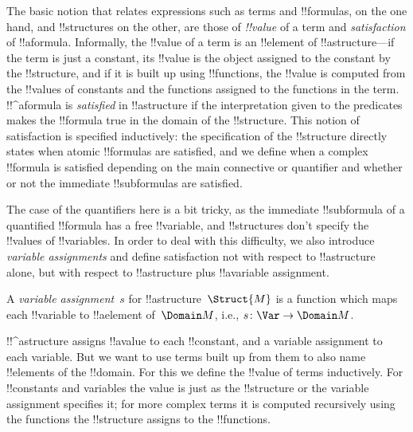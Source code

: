 \begin{explain}
The basic notion that relates expressions such as terms and
!!{formula}s, on the one hand, and !!{structure}s on the other, are
those of \emph{!!{value}} of a term and \emph{satisfaction} of 
!!a{formula}.  Informally, the !!{value} of a term is an !!{element} of
!!a{structure}---if the term is just a constant, its !!{value} is the
object assigned to the constant by the !!{structure}, and if it is
built up using !!{function}s, the !!{value} is computed from the
!!{value}s of constants and the functions assigned to the functions in
the term.  !!^a{formula} is \emph{satisfied} in !!a{structure} if the
interpretation given to the predicates makes the !!{formula} true in
the domain of the !!{structure}. This notion of satisfaction is
specified inductively: the specification of the !!{structure} directly
states when atomic !!{formula}s are satisfied, and we define when a
complex !!{formula} is satisfied depending on the main connective or
quantifier and whether or not the immediate !!{subformula}s are
satisfied. 

The case of the quantifiers here is a bit tricky, as the
immediate !!{subformula} of a quantified !!{formula} has a free
!!{variable}, and !!{structure}s don't specify the !!{value}s of
!!{variable}s.  In order to deal with this difficulty, we also
introduce \emph{variable assignments} and define satisfaction not with
respect to !!a{structure} alone, but with respect to !!a{structure}
plus !!a{variable} assignment.
\end{explain}

\begin{defn}
A \emph{variable assignment}~$s$ for !!a{structure}~$\Struct{M}$ is a
function which maps each !!{variable} to !!a{element} of~$\Domain M$,
i.e., $s\colon \Var \to \Domain M$.
\end{defn}

\begin{explain}
!!^a{structure} assigns !!a{value} to each !!{constant}, and a
variable assignment to each variable.  But we want to use terms built
up from them to also name !!{element}s of the !!{domain}.  For this we
define the !!{value} of terms inductively. For !!{constant}s and
variables the value is just as the !!{structure} or the variable
assignment specifies it; for more complex terms it is computed
recursively using the functions the !!{structure} assigns to the
!!{function}s.
\end{explain}

